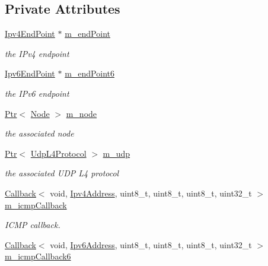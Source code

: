 \subsection*{Private Attributes}
\begin{DoxyCompactItemize}
\item 
\hyperlink{classns3_1_1Ipv4EndPoint}{Ipv4\+End\+Point} $\ast$ \hyperlink{classns3_1_1UdpSocketImpl_a4ea3006a4e49185d06360beba92f4073}{m\+\_\+end\+Point}
\begin{DoxyCompactList}\small\item\em the I\+Pv4 endpoint \end{DoxyCompactList}\item 
\hyperlink{classns3_1_1Ipv6EndPoint}{Ipv6\+End\+Point} $\ast$ \hyperlink{classns3_1_1UdpSocketImpl_ad8b59997645c24d4550092d138270652}{m\+\_\+end\+Point6}
\begin{DoxyCompactList}\small\item\em the I\+Pv6 endpoint \end{DoxyCompactList}\item 
\hyperlink{classns3_1_1Ptr}{Ptr}$<$ \hyperlink{classns3_1_1Node}{Node} $>$ \hyperlink{classns3_1_1UdpSocketImpl_af6a19247be3d8917b582af77337730c3}{m\+\_\+node}
\begin{DoxyCompactList}\small\item\em the associated node \end{DoxyCompactList}\item 
\hyperlink{classns3_1_1Ptr}{Ptr}$<$ \hyperlink{classns3_1_1UdpL4Protocol}{Udp\+L4\+Protocol} $>$ \hyperlink{classns3_1_1UdpSocketImpl_ace4b90c1ab6f4f302cdb4cd8da973514}{m\+\_\+udp}
\begin{DoxyCompactList}\small\item\em the associated U\+DP L4 protocol \end{DoxyCompactList}\item 
\hyperlink{classns3_1_1Callback}{Callback}$<$ void, \hyperlink{classns3_1_1Ipv4Address}{Ipv4\+Address}, uint8\+\_\+t, uint8\+\_\+t, uint8\+\_\+t, uint32\+\_\+t $>$ \hyperlink{classns3_1_1UdpSocketImpl_a0a595e39113e8854c86c820623ae6cd4}{m\+\_\+icmp\+Callback}
\begin{DoxyCompactList}\small\item\em I\+C\+MP callback. \end{DoxyCompactList}\item 
\hyperlink{classns3_1_1Callback}{Callback}$<$ void, \hyperlink{classns3_1_1Ipv6Address}{Ipv6\+Address}, uint8\+\_\+t, uint8\+\_\+t, uint8\+\_\+t, uint32\+\_\+t $>$ \hyperlink{classns3_1_1UdpSocketImpl_aa4fbff077aa5ca080279196abaa87a04}{m\+\_\+icmp\+Callback6}

\end{DoxyCompactItemize}
